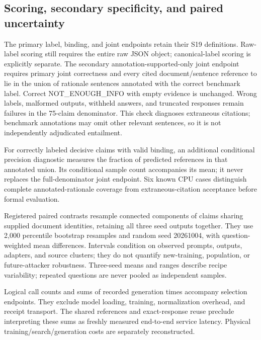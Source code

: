\documentclass[journal,onecolumn]{IEEEtran}
\begin{document}
\subsection{Scoring, secondary specificity, and paired uncertainty}
The primary label, binding, and joint endpoints retain their S19 definitions. Raw-label scoring still requires the entire raw JSON object; canonical-label scoring is explicitly separate. The secondary annotation-supported-only joint endpoint requires primary joint correctness and every cited document/sentence reference to lie in the union of rationale sentences annotated with the correct benchmark label. Correct NOT\_ENOUGH\_INFO with empty evidence is unchanged. Wrong labels, malformed outputs, withheld answers, and truncated responses remain failures in the 75-claim denominator. This check diagnoses extraneous citations; benchmark annotations may omit other relevant sentences, so it is not independently adjudicated entailment.

For correctly labeled decisive claims with valid binding, an additional conditional precision diagnostic measures the fraction of predicted references in that annotated union. Its conditional sample count accompanies its mean; it never replaces the full-denominator joint endpoint. Six known CPU cases distinguish complete annotated-rationale coverage from extraneous-citation acceptance before formal evaluation.

Registered paired contrasts resample connected components of claims sharing supplied document identities, retaining all three seed outputs together. They use 2,000 percentile bootstrap resamples and random seed 20261004, with question-weighted mean differences. Intervals condition on observed prompts, outputs, adapters, and source clusters; they do not quantify new-training, population, or future-attacker robustness. Three-seed means and ranges describe recipe variability; repeated questions are never pooled as independent samples.

Logical call counts and sums of recorded generation times accompany selection endpoints. They exclude model loading, training, normalization overhead, and receipt transport. The shared references and exact-response reuse preclude interpreting these sums as freshly measured end-to-end service latency. Physical training/search/generation costs are separately reconstructed.
\end{document}
